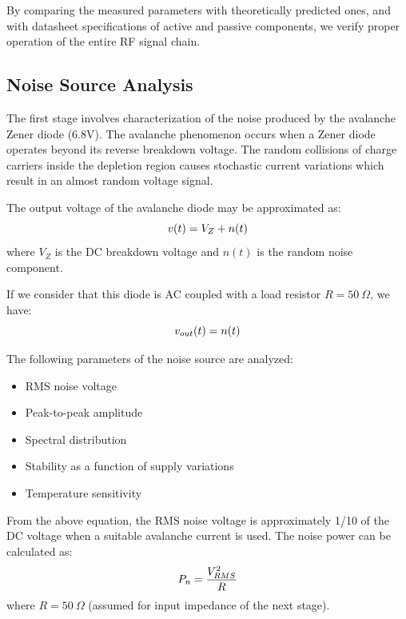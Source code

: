 \documentclass[12pt,a4paper]{report}
\begin{document}
	By comparing the measured parameters with theoretically predicted ones, and with datasheet specifications of active and passive components, we verify proper operation of the entire RF signal chain.
	
	\subsection{Noise Source Analysis}
	The first stage involves characterization of the noise produced by the avalanche Zener diode (6.8V). The avalanche phenomenon occurs when a Zener diode operates beyond its reverse breakdown voltage. The random collisions of charge carriers inside the depletion region causes stochastic current variations which result in an almost random voltage signal.
	
	The output voltage of the avalanche diode may be approximated as:
	\begingroup
	\setlength{\mathindent}{0pt}
	\begin{equation*}
		\hfill
		v(t) = V_Z + n(t)
		\hfill
	\end{equation*}
	\endgroup
	where $V_Z$ is the DC breakdown voltage and $n(t)$ is the random noise component.
	
	If we consider that this diode is AC coupled with a load resistor $R = 50\ \Omega$, we have:
	\begingroup
	\setlength{\mathindent}{0pt}
	\begin{equation*}
		\hfill
		v_{out}(t) = n(t)
		\hfill
	\end{equation*}
	\endgroup
	
	The following parameters of the noise source are analyzed:
	\begin{itemize}
		\item RMS noise voltage
		\item Peak-to-peak amplitude
		\item Spectral distribution
		\item Stability as a function of supply variations
		\item Temperature sensitivity
	\end{itemize}
	
	From the above equation, the RMS noise voltage is approximately 1/10 of the DC voltage when a suitable avalanche current is used. The noise power can be calculated as:
	\begingroup
	\setlength{\mathindent}{0pt}
	\begin{equation*}
		\hfill
		P_n = \frac{V_{RMS}^2}{R}
		\hfill
	\end{equation*}
	\endgroup
	where $R = 50\ \Omega$ (assumed for input impedance of the next stage).
	
\end{document}
